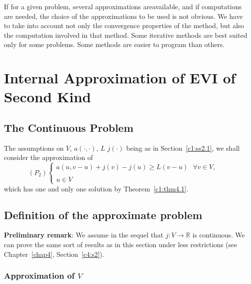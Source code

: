 \begin{remark}\label{c1:rem5.6}%
If for a given problem, several approximations are\break available, and if
computations are needed, the choice of the approximations to be used
is not obvious. We have to take into account not only the convergence
properties of the method, but also the computation involved in that
method. Some iterative methods are best suited only for some
problems. Some methods are easier to program than others. 
\end{remark}

\section{Internal Approximation of EVI of Second Kind}\label{c1:s6}%

\subsection{The Continuous Problem}\label{c1:ss6.1}%

The assumptions on $V$, $a(\cdot , \cdot)$, $L$ $j(\cdot)$ being as in 
Section~\ref{c1:ss2.1}, we shall consider the approximation of  
\begin{equation*}
(P_2)
\begin{cases}
a(u, v - u) + j(v) - j(u) \geq L(v - u) ~~~\forall v \in V,\\
&\\
u \in V
\end{cases}
\end{equation*}
which has one and only one solution by Theorem~\ref{c1:thm4.1}.

\subsection{Definition of the approximate
  problem}\label{c1:ss6.2}%

\textbf{Preliminary remark}: We assume in the sequel that $j : V \to
\mathbb{R}$ is continuous. We can prove the same sort of results as in
this section under less restrictions (see Chapter~\ref{chap4},
Section~\ref{c4:s2}).  

\subsubsection{Approximation of $V$}\label{c1:sss6.2.1}%
 
